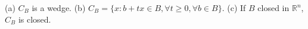 (a) $C_B$ is a wedge. (b) $C_B=\{x:b+tx\in B,\forall t\geqslant0,\forall b\in B\}$. (c) If $B$ closed in $\mathbb{R}^n$, $C_B$ is closed.
